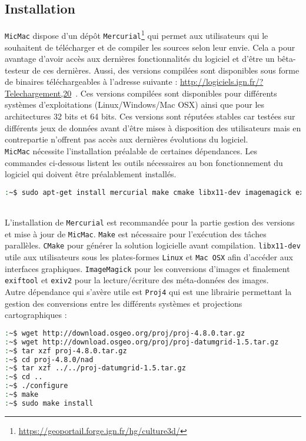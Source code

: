 \subsection{Installation}
{\tt MicMac} dispose d'un dépôt {\tt Mercurial}\footnote{\url{https://geoportail.forge.ign.fr/hg/culture3d/}} qui permet aux utilisateurs qui le souhaitent de télécharger et de compiler les sources selon leur envie. Cela a pour avantage d'avoir accès aux dernières fonctionnalités du logiciel et d'être un bêta-testeur de ces dernières. Aussi, des versions compilées sont disponibles sous forme de binaires téléchargeables à l'adresse suivante : \url{http://logiciels.ign.fr/?Telechargement,20}\ . Ces versions compilées sont disponibles pour différents systèmes d'exploitations (Linux/Windows/Mac OSX) ainsi que pour les architectures 32 bits et 64 bits. Ces versions sont réputées stables car testées sur différents jeux de données avant d'être mises à disposition des utilisateurs mais en contrepartie n'offrent pas accès aux dernières évolutions du logiciel.\newline
\\
{\tt MicMac} nécessite l'installation préalable de certaines dépendances. Les commandes ci-dessous listent les outils nécessaires au bon fonctionnement du logiciel qui doivent être préalablement installés.
\begin{lstlisting}[language=bash]
:~$ sudo apt-get install mercurial make cmake libx11-dev imagemagick exiftool exiv2
\end{lstlisting}
~\\
L'installation de {\tt Mercurial} est recommandée pour la partie gestion des versions et mise à jour de {\tt MicMac}. {\tt Make} est nécessaire pour l’exécution des tâches parallèles. {\tt CMake} pour générer la solution logicielle avant compilation. {\tt libx11-dev} utile aux utilisateurs sous les plates-formes {\tt Linux} et {\tt Mac OSX} afin d'accéder aux interfaces graphiques. {\tt ImageMagick} pour les conversions d'images et finalement {\tt exiftool} et {\tt exiv2} pour la lecture/écriture des méta-données des images.\newline
\\
Autre dépendance qui s'avère utile est {\tt Proj4} qui est une librairie permettant la gestion des conversions entre les différents systèmes et projections cartographiques :
\begin{lstlisting}[language=bash]
:~$ wget http://download.osgeo.org/proj/proj-4.8.0.tar.gz
:~$ wget http://download.osgeo.org/proj/proj-datumgrid-1.5.tar.gz
:~$ tar xzf proj-4.8.0.tar.gz
:~$ cd proj-4.8.0/nad
:~$ tar xzf ../../proj-datumgrid-1.5.tar.gz
:~$ cd ..
:~$ ./configure
:~$ make
:~$ sudo make install
\end{lstlisting}

